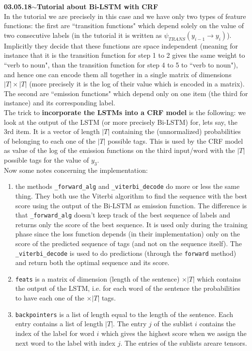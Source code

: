 \documentclass[11pt,a4paper]{article}
\newenvironment{loggentry}[2]%
{\noindent\textbf{#1}\hspace{1cm}$\mathbf{\sim}$\text{ }\textbf{#2}\\}{\vspace{0.5cm}}
\begin{document}
\begin{loggentry}{03.05.18}{Tutorial about Bi-LSTM with CRF}
In the tutorial we are precisely in this case and we have only two types of feature functions: the first are ``transition functions" which depend solely on the value of two consecutive labels (in the tutorial it is written as $\psi_{TRANS}(y_{i-1}\to y_i)$). Implicitly they decide that these functions are space independent (meaning for instance that it is the transition function for step 1 to 2 gives the same weight to ``verb to noun", than the transition function for step 4 to 5 to ``verb to noun"), and hence one can encode them all together in a single matrix of dimensions $|T|\times |T|$ (more precisely it is the log of their value which is encoded in a matrix). The second are ``emission functions" which depend only on one item (the third for instance) and its corresponding label.\\
The trick to \textbf{incorporate the LSTMs into a CRF model} is the following: we look at the output of the LSTM (or more precisely Bi-LSTM) for, lets say, the 3rd item. It is a vector of length $|T|$ containing the (unnormalized) probabilities of belonging to each one of the $|T|$ possible tags. This is used by the CRF model as value of the log of the emission functions on the third input/word with the $|T|$ possible tags for the value of $y_3$.\\
Now some notes concerning the implementation:\\
\begin{enumerate}
\item the methods \texttt{\_forward\_alg} and \texttt{\_viterbi\_decode} do more or less the same thing. They both use the Viterbi algorithm to find the sequence with the best score using the output of the Bi-LSTM as emission function. The difference is that \texttt{\_forward\_alg} doesn't keep track of the best sequence of labels and returns only the score of the best sequence. It is used only during the training phase since the loss function depends (in their implementation) only on the score of the predicted sequence of tags (and not on the sequence itself). The \texttt{\_viterbi\_decode} is used to do predictions (through the \texttt{forward} method) and return both the optimal sequence and its score.
\item \texttt{feats} is a matrix of dimension (length of the sentence) $\times |T|$ which contains the output of the LSTM, i.e. for each word of the sentence the probabilities to have each one of the $\times |T|$ tags.
\item \texttt{backpointers} is a list of length equal to the length of the sentence. Each entry contains a list of length $|T|$. The entry $j$ of the sublist $i$ contains the index of the label for word $i$ which gives the highest score when we assign the next word to the label with index $j$. The entries of the sublists areare tensors.

\end{enumerate}
\end{loggentry}
\end{document}
